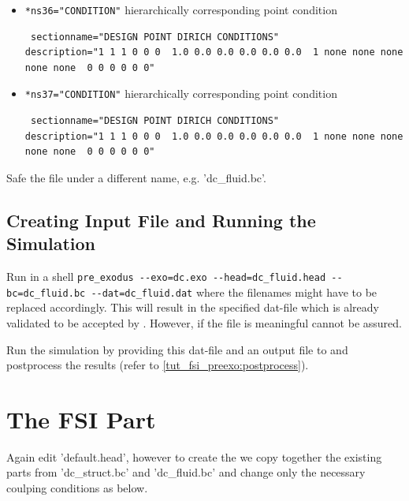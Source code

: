 \begin{itemize}
\begin{small}
\begin{verbatim}
\end{verbatim} \end{small} \item \verb|*ns36="CONDITION"| \qquad hierarchically corresponding point condition
\begin{small} \begin{verbatim} sectionname="DESIGN POINT DIRICH CONDITIONS"
description="1 1 1 0 0 0  1.0 0.0 0.0 0.0 0.0 0.0  1 none none none none none  0 0 0 0 0 0"
\end{verbatim} \end{small} \item \verb|*ns37="CONDITION"| \qquad hierarchically corresponding point condition
\begin{small} \begin{verbatim} sectionname="DESIGN POINT DIRICH CONDITIONS"
description="1 1 1 0 0 0  1.0 0.0 0.0 0.0 0.0 0.0  1 none none none none none  0 0 0 0 0 0"
\end{verbatim} \end{small}

\end{itemize}
Safe the file under a different name, e.g. 'dc\_fluid.bc'.

\subsection{Creating \baci{} Input File and Running the Simulation}
Run in a shell \verb|pre_exodus --exo=dc.exo --head=dc_fluid.head --bc=dc_fluid.bc --dat=dc_fluid.dat| where the filenames might have to be replaced accordingly. This will result in the specified dat-file which is already validated to be accepted by \baci{}. However, if the file is meaningful cannot be assured.

Run the simulation by providing this dat-file and an output file to \baci{} and postprocess the results (refer to \ref{tut_fsi_preexo:postprocess}).

\section{The FSI Part}
Again edit 'default.head', however to create the \bc we copy together the existing parts from 'dc\_struct.bc' and 'dc\_fluid.bc' and change only the necessary coulping conditions as below.

